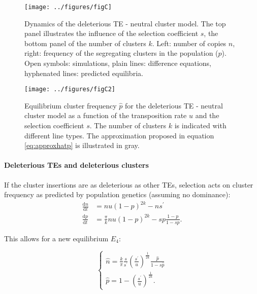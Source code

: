 \documentclass[10pt,a4paper]{article}
\begin{document}
\begin{figure}[h]
\begin{adjustwidth}{-1in}{0in}
\begin{flushright}
	\texttt{[image: ../figures/figC]}
\caption{\label{fig:figC} Dynamics of the deleterious TE - neutral cluster model. The top panel illustrates the influence of the selection coefficient $s$, the bottom panel of the number of clusters $k$. Left: number of copies $n$, right: frequency of the segregating clusters in the population ($p$). Open symbols: simulations, plain lines: difference equations, hyphenated lines: predicted equilibria. }
\end{flushright}\end{adjustwidth}
\end{figure}

\begin{figure}[h]
\begin{adjustwidth}{-1in}{0in}
\begin{flushright}
	\texttt{[image: ../figures/figC2]}
\caption{\label{fig:figC2} Equilibrium cluster frequency $\hat p$ for the deleterious TE - neutral cluster model as a function of the transposition rate $u$ and the selection coefficient $s$. The number of clusters $k$ is indicated with different line types. The approximation proposed in equation \ref{eq:approxhatp} is illustrated in gray. }
\end{flushright}\end{adjustwidth}
\end{figure}


\paragraph{Deleterious TEs and deleterious clusters} If the cluster insertions are as deleterious as other TEs, selection acts on cluster frequency as predicted by population genetics (assuming no dominance): 
\begin{equation}\label{eq:selps}
\begin{split}
\frac{\mathrm d n}{\mathrm d t} &= n u (1-p)^{2k} - n s^\prime \\
\frac{\mathrm d p}{\mathrm d t} &= \frac{\pi}{k} n u (1-p)^{2k} - s p \frac{1-p}{1- s p}.
\end{split}
\end{equation}

This allows for a new equilibrium $E_4$:

\begin{equation}\label{eq:selpseq}
\begin{cases}
\displaystyle \hat n = \frac{k}{\pi}\frac{s}{s^\prime} \left(\frac{s^\prime}{u}\right)^\frac{1}{2k}\frac{\hat p}{1-s\hat p} \\
\displaystyle \hat p = 1 - \left(\frac{s^\prime}{u}\right)^\frac{1}{2k}.
\end{cases}
\end{equation}
\end{document}
